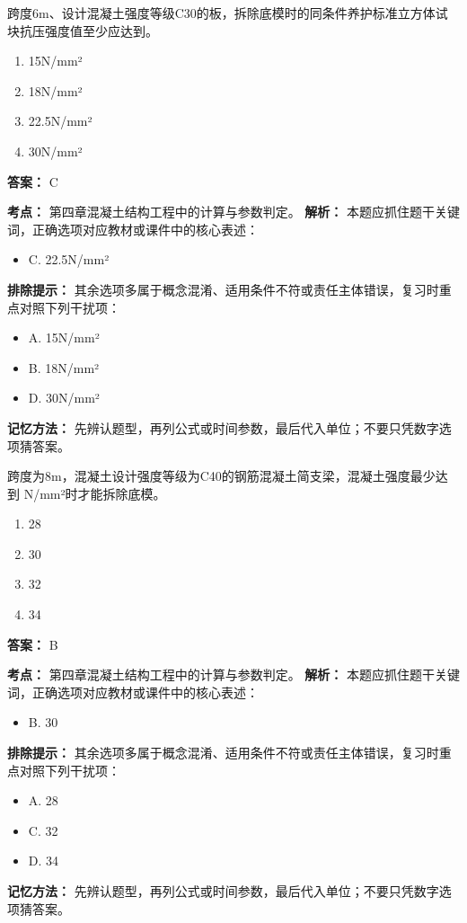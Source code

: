 \documentclass[UTF8,fontset=fandol,11pt]{ctexart}
\begin{document}
\begin{quizbox}[title={第 38 题}]
跨度6m、设计混凝土强度等级C30的板，拆除底模时的同条件养护标准立方体试块抗压强度值至少应达到。\\
\begin{enumerate}[label=\Alph*.]
\item 15N/mm²
\item 18N/mm²
\item 22.5N/mm²
\item 30N/mm²
\end{enumerate}
\textbf{答案：} C
\vspace{0.25em}
\begin{answerbox}[title={考点解析}]
\textbf{考点：} 第四章混凝土结构工程中的计算与参数判定。
\textbf{解析：} 本题应抓住题干关键词，正确选项对应教材或课件中的核心表述：
\begin{itemize}
\item C. 22.5N/mm²
\end{itemize}
\textbf{排除提示：} 其余选项多属于概念混淆、适用条件不符或责任主体错误，复习时重点对照下列干扰项：
\begin{itemize}
\item A. 15N/mm²
\item B. 18N/mm²
\item D. 30N/mm²
\end{itemize}
\textbf{记忆方法：} 先辨认题型，再列公式或时间参数，最后代入单位；不要只凭数字选项猜答案。
\end{answerbox}
\end{quizbox}

\begin{quizbox}[title={第 39 题}]
跨度为8m，混凝土设计强度等级为C40的钢筋混凝土简支梁，混凝土强度最少达到 N/mm²时才能拆除底模。\\
\begin{enumerate}[label=\Alph*.]
\item 28
\item 30
\item 32
\item 34
\end{enumerate}
\textbf{答案：} B
\vspace{0.25em}
\begin{answerbox}[title={考点解析}]
\textbf{考点：} 第四章混凝土结构工程中的计算与参数判定。
\textbf{解析：} 本题应抓住题干关键词，正确选项对应教材或课件中的核心表述：
\begin{itemize}
\item B. 30
\end{itemize}
\textbf{排除提示：} 其余选项多属于概念混淆、适用条件不符或责任主体错误，复习时重点对照下列干扰项：
\begin{itemize}
\item A. 28
\item C. 32
\item D. 34
\end{itemize}
\textbf{记忆方法：} 先辨认题型，再列公式或时间参数，最后代入单位；不要只凭数字选项猜答案。
\end{answerbox}
\end{quizbox}
\end{document}
